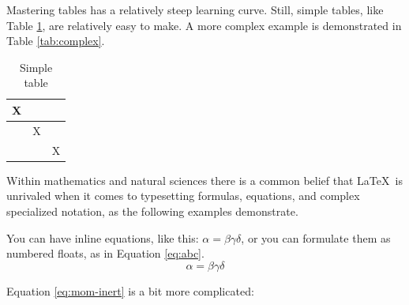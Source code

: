 Mastering tables has a relatively steep learning curve.
Still, simple tables, like Table \ref{tab:simple}, are relatively easy to make.
A more complex example is demonstrated in Table \ref{tab:complex}.

\begin{table}[!h]
\centering
\begin{tabular}{c|c|c}
X &  & \\
\hline
& X & \\
\hline
 &  & X \\
\end{tabular}
\caption{Simple table}
\label{tab:simple}
\end{table}


\begin{table}[!h]
\centering
{}
\caption{Complex table}
\label{tab:complex}
\end{table}

Within mathematics and natural sciences there is a common belief that  \LaTeX\ is unrivaled when it comes to typesetting formulas, equations, and complex specialized notation, as the following examples demonstrate.


You can have inline equations, like this: $ \alpha = \beta \gamma \delta $, or you can formulate them as numbered floats, as in Equation \ref{eq:abc}.
\begin{equation}
  \alpha = \beta \gamma \delta
  \label{eq:abc}
\end{equation}

Equation \ref{eq:mom-inert} is a bit more complicated:

